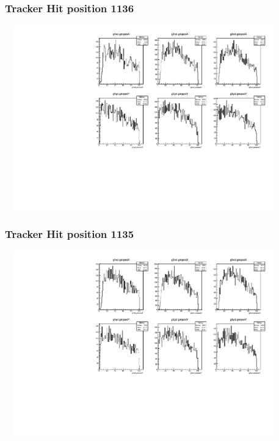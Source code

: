 \documentclass[slidestop,compress,mathserif]{beamer}
\begin{document}
\begin{frame}\frametitle{Tracker Hit position 1136}
	 \includegraphics[width=12cm,height=8cm]{Tracker_Hit_position_1136.pdf}
\end{frame}
\begin{frame}\frametitle{Tracker Hit position 1135}
	 \includegraphics[width=12cm,height=8cm]{Tracker_Hit_position_1135.pdf}
\end{frame}
\end{document}
